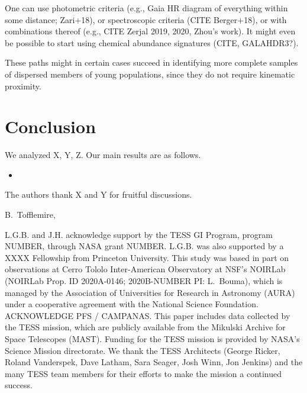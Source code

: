 \documentclass[12pt,twocolumn,tighten]{aastex63}
\begin{document}
One can use photometric criteria (e.g., Gaia HR diagram of
everything within some distance; Zari+18), or spectroscopic
criteria (CITE Berger+18), or with combinations thereof (e.g., CITE
Zerjal 2019, 2020, Zhou's work).  
It might even be possible to start using chemical abundance signatures
(CITE, GALAHDR3?).

These paths might in certain cases succeed in identifying more
complete samples of dispersed members of young populations, since they
do not require kinematic proximity.


\section{Conclusion}
\label{sec:conclusion}

We analyzed X, Y, Z.
Our main results are as follows.
\begin{itemize}
	\item 
\end{itemize}




\acknowledgements
\raggedbottom

The authors thank X and Y for fruitful discussions.

B.~Tofflemire, %


%
L.G.B. and J.H. acknowledge support by the TESS GI Program, program
NUMBER, through NASA grant NUMBER.
L.G.B. was also supported by a XXXX Fellowship from Princeton
University.
%
This study was based in part on observations at Cerro Tololo
Inter-American Observatory at NSF's NOIRLab (NOIRLab Prop. ID
2020A-0146; 2020B-NUMBER PI: L{.}~Bouma), which is managed by the
Association of Universities for Research in Astronomy (AURA) under a
cooperative agreement with the National Science Foundation.
%
ACKNOWLEDGE PFS / CAMPANAS.
%
This paper includes data collected by the TESS mission, which are
publicly available from the Mikulski Archive for Space Telescopes
(MAST).
%
Funding for the TESS mission is provided by NASA's Science Mission
directorate.
%
We thank the TESS Architects (George Ricker, Roland Vanderspek, Dave
Latham, Sara Seager, Josh Winn, Jon Jenkins) and the many TESS team
members for their efforts to make the mission a continued success.
%

%
%
\end{document}
